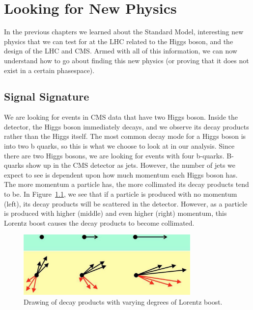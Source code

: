 \chapter{Looking for New Physics}\label{Sec:BSM}

In the previous chapters we learned about the Standard Model, interesting new physics that we can test for at the LHC related to the Higgs boson, and the design of the LHC and CMS. Armed with all of this information, we can now understand how to go about finding this new physics (or proving that it does not exist in a certain phasespace).
\vspace{5mm}

\section{Signal Signature}

We are looking for events in CMS data that have two Higgs boson. Inside the detector, the Higgs boson immediately decays, and we observe its decay products rather than the Higgs itself. The most common decay mode for a Higgs boson is into two b quarks, so this is what we choose to look at in our analysis. Since there are two Higgs bosons, we are looking for events with four b-quarks. B-quarks show up in the CMS detector as jets. However, the number of jets we expect to see is dependent upon how much momentum each Higgs boson has. The more momentum a particle has, the more collimated its decay products tend to be. In Figure~\ref{Fig:lorentzboost}, we see that if a particle is produced with no momentum (left), its decay products will be scattered in the detector. However, as a particle is produced with higher (middle) and even higher (right) momentum, this Lorentz boost causes the decay products to become collimated. 
\begin{figure}[h!]
    \centering
        \includegraphics[width=0.8\textwidth]{F4/boost.png}
        \caption{Drawing of decay products with varying degrees of Lorentz boost.}
        \label{Fig:lorentzboost}
\end{figure}

